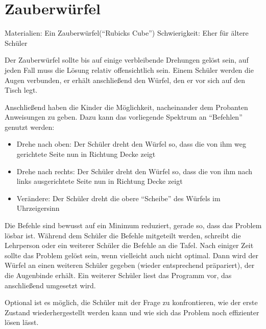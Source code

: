 \section{Zauberwürfel}\label{zauberwuxfcrfel}

Materialien: Ein Zauberwürfel(``Rubicks Cube'') Schwierigkeit: Eher für
ältere Schüler

Der Zauberwürfel sollte bis auf einige verbleibende Drehungen gelöst
sein, auf jeden Fall muss die Lösung relativ offensichtlich sein. Einem
Schüler werden die Augen verbunden, er erhält anschließend den Würfel,
den er vor sich auf den Tisch legt.

Anschließend haben die Kinder die Möglichkeit, nacheinander dem
Probanten Anweisungen zu geben. Dazu kann das vorliegende Spektrum an
``Befehlen'' genutzt werden:

\begin{itemize}
\item
  Drehe nach oben: Der Schüler dreht den Würfel so, dass die von ihm
  weg gerichtete Seite nun in Richtung Decke zeigt
\item
  Drehe nach rechts: Der Schüler dreht den Würfel so, dass die von ihm
  nach links ausgerichtete Seite nun in Richtung Decke zeigt
\item
  Verändere: Der Schüler dreht die obere ``Scheibe'' des Würfels im
  Uhrzeigersinn
\end{itemize}

Die Befehle sind bewusst auf ein Minimum reduziert, gerade so, dass das
Problem lösbar ist. Während dem Schüler die Befehle mitgeteilt werden,
schreibt die Lehrperson oder ein weiterer Schüler die Befehle an die
Tafel. Nach einiger Zeit sollte das Problem gelöst sein, wenn vielleicht
auch nicht optimal. Dann wird der Würfel an einen weiteren Schüler
gegeben (wieder entsprechend präpariert), der die Augenbinde erhält. Ein
weiterer Schüler liest das Programm vor, das anschließend umgesetzt
wird.

Optional ist es möglich, die Schüler mit der Frage zu konfrontieren, wie
der erste Zustand wiederhergestellt werden kann und wie sich das Problem
noch effizienter lösen lässt.

